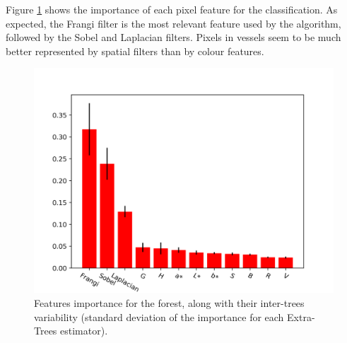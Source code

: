 Figure \ref{fig:importance} shows the importance of each pixel feature for the classification. As expected, the Frangi filter is the most relevant feature used by the algorithm, followed by the Sobel and Laplacian filters. Pixels in vessels seem to be much better represented by spatial filters than by colour features.

\begin{figure}[H]
  \includegraphics[width=\textwidth]{figures/importances}
  \caption{Features importance for the forest, along with their inter-trees variability (standard deviation of the importance for each Extra-Trees estimator).} \label{fig:importance}
\end{figure}
